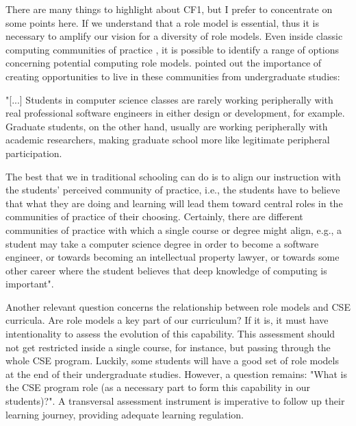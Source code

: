 There are many things to highlight about \gls{CF}1, but I prefer to concentrate on some points here. If we understand that a role model is essential, thus it is necessary to amplify our vision for a diversity of role models. Even inside classic computing communities of practice \cite{wenger:2002}, it is possible to identify a range of options concerning potential computing role models.  pointed out the importance of creating opportunities to live in these communities from undergraduate studies:
\begin{citacao}
    "[...] Students in computer science classes are rarely working peripherally with real professional software engineers in either design or development, for example. Graduate students, on the other hand, usually are working peripherally with academic researchers, making graduate school more like legitimate peripheral participation.
    
    The best that we in traditional schooling can do is to align our instruction with the students’ perceived community of practice, i.e., the students have to believe that what they are doing and learning will lead them toward central roles in the communities of practice of their choosing. Certainly, there are different communities of practice with which a single course or degree might align, e.g., a student may take a computer science degree in order to become a software engineer, or towards becoming an intellectual property lawyer, or towards some other career where the student believes that deep knowledge of computing is important".
\end{citacao}

Another relevant question concerns the relationship between role models and \gls{CSE} curricula. Are role models a key part of our curriculum? If it is, it must have intentionality to assess the evolution of this capability. This assessment should not get restricted inside a single course, for instance, but passing through the whole \gls{CSE} program. Luckily, some students will have a good set of role models at the end of their undergraduate studies. However, a question remains: "What is the \gls{CSE} program role (as a necessary part to form this capability in our students)?". A transversal assessment instrument is imperative to follow up their learning journey, providing adequate learning regulation. 

